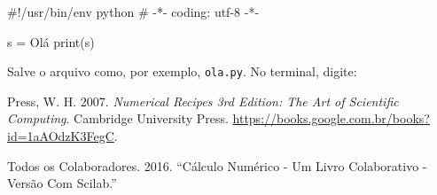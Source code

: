 \documentclass[
  a4paper,
  DIV=11,
  numbers=noendperiod,
  oneside]{scrreprt}
\newenvironment{Shaded}{\begin{snugshade}}{\end{snugshade}}
\newcommand{\BuiltInTok}[1]{\textcolor[rgb]{0.00,0.23,0.31}{#1}}
\newcommand{\CommentTok}[1]{\textcolor[rgb]{0.37,0.37,0.37}{#1}}
\newcommand{\ExtensionTok}[1]{\textcolor[rgb]{0.00,0.23,0.31}{#1}}
\newcommand{\NormalTok}[1]{\textcolor[rgb]{0.00,0.23,0.31}{#1}}
\newcommand{\OperatorTok}[1]{\textcolor[rgb]{0.37,0.37,0.37}{#1}}
\newcommand{\StringTok}[1]{\textcolor[rgb]{0.13,0.47,0.30}{#1}}
\newlength{\cslhangindent}
\newenvironment{CSLReferences}[2] %
 {\begin{list}{}{%
  \setlength{\itemindent}{0pt}
  \setlength{\leftmargin}{0pt}
  \setlength{\parsep}{0pt}
  \ifodd #1
   \setlength{\leftmargin}{\cslhangindent}
   \setlength{\itemindent}{-1\cslhangindent}
  \fi
  \setlength{\itemsep}{#2\baselineskip}}}
 {\end{list}}
\begin{document}
\begin{tcolorbox}
\begin{enumerate}
\begin{Shaded}
\begin{Highlighting}[]
\CommentTok{\#!/usr/bin/env python}
\CommentTok{\# {-}*{-} coding: utf{-}8 {-}*{-}}

\NormalTok{s }\OperatorTok{=} \StringTok{\textquotesingle{}Olá\textquotesingle{}}
\BuiltInTok{print}\NormalTok{(s)}
\end{Highlighting}
\end{Shaded}

  Salve o arquivo como, por exemplo, \texttt{ola.py}. No terminal,
  digite:

\begin{Shaded}
\end{Shaded}
\end{enumerate}

\end{tcolorbox}

\label{refs}
\begin{CSLReferences}{1}{0}
Press, W. H. 2007. \emph{Numerical Recipes 3rd Edition: The Art of
Scientific Computing}. Cambridge University Press.
\url{https://books.google.com.br/books?id=1aAOdzK3FegC}.

Todos os Colaboradores. 2016. {``Cálculo Numérico - Um Livro
Colaborativo - Versão Com Scilab.''}

\end{CSLReferences}
\end{document}
